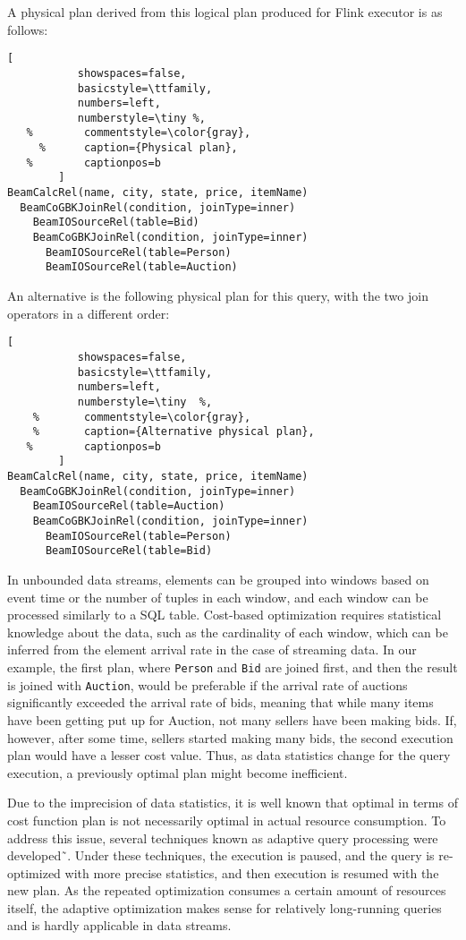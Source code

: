 A physical plan derived from this logical plan produced for Flink executor is as follows:

\begin{lstlisting}[
           showspaces=false,
           basicstyle=\ttfamily,
           numbers=left,
           numberstyle=\tiny %,
   %        commentstyle=\color{gray},
     %      caption={Physical plan}, 
   %        captionpos=b
        ]
BeamCalcRel(name, city, state, price, itemName)
  BeamCoGBKJoinRel(condition, joinType=inner)
    BeamIOSourceRel(table=Bid)
    BeamCoGBKJoinRel(condition, joinType=inner)
      BeamIOSourceRel(table=Person)
      BeamIOSourceRel(table=Auction)
\end{lstlisting}

An alternative is  the following physical plan for this query, with the two join operators in a different order:

\begin{lstlisting}[
           showspaces=false,
           basicstyle=\ttfamily,
           numbers=left,
           numberstyle=\tiny  %,
    %       commentstyle=\color{gray},
    %       caption={Alternative physical plan}, 
   %        captionpos=b
        ]
BeamCalcRel(name, city, state, price, itemName)
  BeamCoGBKJoinRel(condition, joinType=inner)
    BeamIOSourceRel(table=Auction)
    BeamCoGBKJoinRel(condition, joinType=inner)
      BeamIOSourceRel(table=Person)
      BeamIOSourceRel(table=Bid)        
\end{lstlisting}


In unbounded data streams, elements can be grouped into windows based on event time or the number of tuples in each window, and each window can be processed similarly to a SQL table. 
Cost-based optimization requires statistical knowledge about the data, such as the cardinality of each window, which can be inferred from the element arrival rate in the case of streaming data. 
In our example, the first plan, where \texttt{Person} and \texttt{Bid} are joined first, and then the result is joined with \texttt{Auction}, would be preferable if the arrival rate of auctions significantly exceeded the arrival rate of bids, meaning that while many items have been getting put up for Auction, not many sellers have been making bids. 
If, however, after some time, sellers started making many bids, the second execution plan would have a lesser cost value. Thus, as data statistics change for the query execution, a previously optimal plan might become inefficient. 

Due to the imprecision of data statistics, it is well known that optimal in terms of cost function plan is not necessarily optimal in actual resource consumption. To address this issue, several techniques known as adaptive query processing were developed˜\cite{deshpande2007adaptive}. Under these techniques, the execution is paused, and the query is re-optimized with more precise statistics, and then execution is resumed with the new plan. As the repeated optimization consumes a certain amount of resources itself, the adaptive optimization makes sense for relatively long-running queries and is hardly applicable in data streams. 

